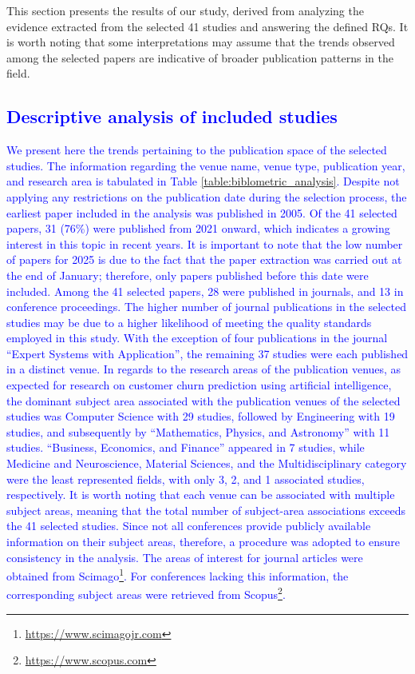 \documentclass[preprint,12pt]{elsarticle}
\begin{document}
This section presents the results of our study, derived from analyzing the evidence extracted from the selected 41 studies and answering the defined RQs. It is worth noting that some interpretations may assume that the trends observed among the selected papers are indicative of broader publication patterns in the field.


\subsection{\textcolor{blue}{Descriptive analysis of included studies}}
\textcolor{blue}{We present here the trends pertaining to the publication space of the selected studies. The information regarding the venue name, venue type, publication year, and research area is tabulated in Table \ref{table:biblometric_analysis}. 
Despite not applying any restrictions on the publication date during the selection process, the earliest paper included in the analysis was published in 2005. Of the 41 selected papers, 31 (76\%) were published from 2021 onward, which indicates a growing interest in this topic in recent years. It is important to note that the low number of papers for 2025 is due to the fact that the paper extraction was carried out at the end of January; therefore, only papers published before this date were included.
Among the 41 selected papers, 28 were published in journals, and 13 in conference proceedings. 
The higher number of journal publications in the selected studies may be due to a higher likelihood of meeting the quality standards employed in this study.
With the exception of four publications in the journal ``Expert Systems with Application'', the remaining 37 studies were each published in a distinct venue.
In regards to the research areas of the publication venues, as expected for research on customer churn prediction using artificial intelligence, the dominant subject area associated with the publication venues of the selected studies was Computer Science with 29 studies, followed by Engineering with 19 studies, and subsequently by ``Mathematics, Physics, and Astronomy'' with 11 studies. ``Business, Economics, and Finance'' appeared in 7 studies, while Medicine and Neuroscience, Material Sciences, and the Multidisciplinary category were the least represented fields, with only 3, 2, and 1 associated studies, respectively. It is worth noting that each venue can be associated with multiple subject areas, meaning that the total number of subject-area associations exceeds the 41 selected studies.
Since not all conferences provide publicly available information on their subject areas, therefore, a procedure was adopted to ensure consistency in the analysis. The areas of interest for journal articles were obtained from Scimago\footnote{\url{https://www.scimagojr.com}}. For conferences lacking this information, the corresponding subject areas were retrieved from Scopus\footnote{\url{https://www.scopus.com}}.}
\end{document}
